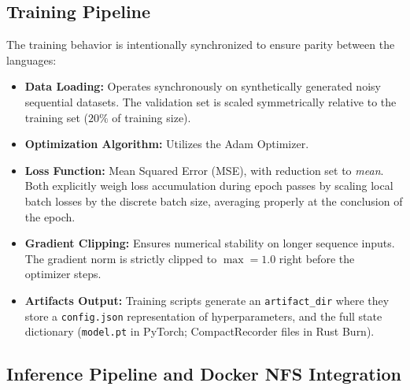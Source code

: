 \documentclass{ieeeaccess}
\begin{document}
\subsection{Training Pipeline}
The training behavior is intentionally synchronized to ensure parity between the languages:
\begin{itemize}
    \item \textbf{Data Loading:} Operates synchronously on synthetically generated noisy sequential datasets. The validation set is scaled symmetrically relative to the training set ($20\%$ of training size).
    \item \textbf{Optimization Algorithm:} Utilizes the Adam Optimizer.
    \item \textbf{Loss Function:} Mean Squared Error (MSE), with reduction set to \textit{mean}. Both explicitly weigh loss accumulation during epoch passes by scaling local batch losses by the discrete batch size, averaging properly at the conclusion of the epoch.
    \item \textbf{Gradient Clipping:} Ensures numerical stability on longer sequence inputs. The gradient norm is strictly clipped to $\max = 1.0$ right before the optimizer steps.
    \item \textbf{Artifacts Output:} Training scripts generate an \texttt{artifact\_dir} where they store a \texttt{config.json} representation of hyperparameters, and the full state dictionary (\texttt{model.pt} in PyTorch; CompactRecorder files in Rust Burn).
\end{itemize}

\subsection{Inference Pipeline and Docker NFS Integration}
\end{document}
